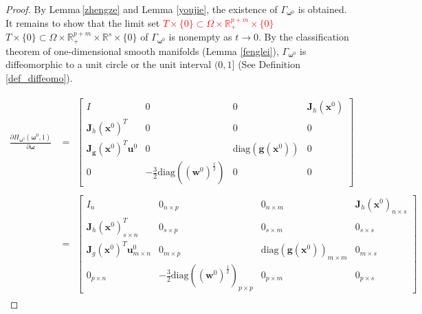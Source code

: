 \documentclass[11pt,pdflatex,sn-mathphys-ay]{sn-jnl}%
\theoremstyle{definition}
\theoremstyle{thmstyleone}%
\theoremstyle{thmstyletwo}%
\theoremstyle{thmstylethree}%
\newcommand{\del}[1]{\textcolor{red}{\sout{#1}}}
\newcommand{\add}[1]{\textcolor{revisionblue}{#1}}
\begin{document}
	\begin{proof} By \add{Lemma}\,\ref{zhengze} and Lemma \ref{youjie}, the existence of $\Gamma_{\bm{\omega}^0}$ is obtained. It remains to show
		that the limit set \del{$T\times \{0\}\subset \Omega \times
			\mathbb{R}^{p+m}_{+}\times \{0\}$} 
		\add{$T\times \{0\}\subset
			\Omega \times \mathbb{R}^{p+m}_{+}
			\times\mathbb{R}^s\times \{0\}$ }of $\Gamma_{\bm{\omega}^0}$ is nonempty as
		$t\rightarrow 0.$  By the classification theorem of
		one-dimensional smooth manifolds (Lemma \ref{fenglei}), $\Gamma_{\bm{\omega}^0}$ is
		diffeomorphic to a unit circle or the unit interval $(0,1]$ (See Definition \ref{def_diffeomo}). 
		
		\begin{align*}
			\frac{\partial H_{\bm{\omega}^0}( \bm{\omega} ^0, 1)}{\partial \bm{\omega}} &=
			\begin{matrix}
				\begin{bmatrix}
					I & 0 & 0 & \textbf{J}_ h(\bm{x}^0) \\
					\textbf{J}_ h(\bm{x}^0)^T & 0 & 0 & 0 \\
					\textbf{J}_{\bm{g}}(\bm{x}^0)^T\bm{u}^0 & 0 & \text{diag}(\bm{g}(\bm{x}^0)) & 0\\
					0 & -\frac{3}{2} \text{diag}((\textbf{w}^{0})^{\frac{1}{2}}) & 0 & 0 
				\end{bmatrix}
			\end{matrix}\\
			&= \begin{matrix}
				\begin{bmatrix}
					I_{n} & 0_{n\times p} & 0_{n\times m} & \textbf{J}_ h(\bm{x}^0)_{n\times s} \\
					\textbf{J}_h(\bm{x}^0)^T_{s\times n} & 0_{s\times p} & 0_{s\times m} & 0_{s\times s} \\
					\textbf{J}_g(\bm{x}^0)^T\bm{u}^0_{m\times n} & 0_{m\times p} & \text{diag}(\bm{g}(\bm{x}^0))_{m\times m} & 0_{m\times s}\\
					0_{p\times n} & -\frac{3}{2} \text{diag}((\textbf{w}^{0})^{\frac{1}{2}})_{p\times p} & 0_{p\times m} & 0_{p\times s}
				\end{bmatrix}
			\end{matrix}
		\end{align*}
		

\end{proof}
\end{document}
